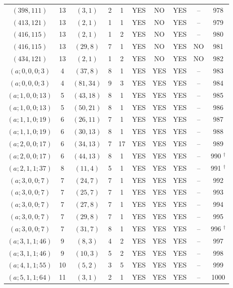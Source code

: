 \begin{longtable}{|c|c|c|c|c|c|c|c|c|c|}
$(398, 111)$ & 13 & $(3, 1)$ & 2 & 1 & YES & NO & YES & -- & 978\\
$(413, 121)$ & 13 & $(2, 1)$ & 1 & 1 & YES & NO & YES & -- & 979\\
$(416, 115)$ & 13 & $(2, 1)$ & 1 & 2 & YES & NO & YES & -- & 980\\
$(416, 115)$ & 13 & $(29, 8)$ & 7 & 1 & YES & NO & YES & NO & 981\\
$(434, 121)$ & 13 & $(2, 1)$ & 1 & 2 & YES & NO & YES & NO & 982\\
$(a; 0, 0, 0; 3)$ & 4 & $(37, 8)$ & 8 & 1 & YES & YES & YES & -- & 983\\
$(a; 0, 0, 0; 3)$ & 4 & $(81, 34)$ & 9 & 3 & YES & YES & YES & -- & 984\\
$(a; 1, 0, 0; 13)$ & 5 & $(43, 18)$ & 8 & 1 & YES & YES & YES & -- & 985\\
$(a; 1, 0, 0; 13)$ & 5 & $(50, 21)$ & 8 & 1 & YES & YES & YES & -- & 986\\
$(a; 1, 1, 0; 19)$ & 6 & $(26, 11)$ & 7 & 1 & YES & YES & YES & -- & 987\\
$(a; 1, 1, 0; 19)$ & 6 & $(30, 13)$ & 8 & 1 & YES & YES & YES & -- & 988\\
$(a; 2, 0, 0; 17)$ & 6 & $(34, 13)$ & 7 & 17 & YES & YES & YES & -- & 989\\
$(a; 2, 0, 0; 17)$ & 6 & $(44, 13)$ & 8 & 1 & YES & YES & YES & -- & 990 ${}^\dagger$\\
$(a; 2, 1, 1; 37)$ & 8 & $(11, 4)$ & 5 & 1 & YES & YES & YES & -- & 991 ${}^\dagger$\\
$(a; 3, 0, 0; 7)$ & 7 & $(24, 7)$ & 7 & 1 & YES & YES & YES & -- & 992\\
$(a; 3, 0, 0; 7)$ & 7 & $(25, 7)$ & 7 & 1 & YES & YES & YES & -- & 993\\
$(a; 3, 0, 0; 7)$ & 7 & $(27, 8)$ & 7 & 1 & YES & YES & YES & -- & 994\\
$(a; 3, 0, 0; 7)$ & 7 & $(29, 8)$ & 7 & 1 & YES & YES & YES & -- & 995\\
$(a; 3, 0, 0; 7)$ & 7 & $(31, 7)$ & 8 & 1 & YES & YES & YES & -- & 996 ${}^\dagger$\\
$(a; 3, 1, 1; 46)$ & 9 & $(8, 3)$ & 4 & 2 & YES & YES & YES & -- & 997\\
$(a; 3, 1, 1; 46)$ & 9 & $(10, 3)$ & 5 & 2 & YES & YES & YES & -- & 998\\
$(a; 4, 1, 1; 55)$ & 10 & $(5, 2)$ & 3 & 5 & YES & YES & YES & -- & 999\\
$(a; 5, 1, 1; 64)$ & 11 & $(3, 1)$ & 2 & 1 & YES & YES & YES & -- & 1000\\

\end{longtable}
